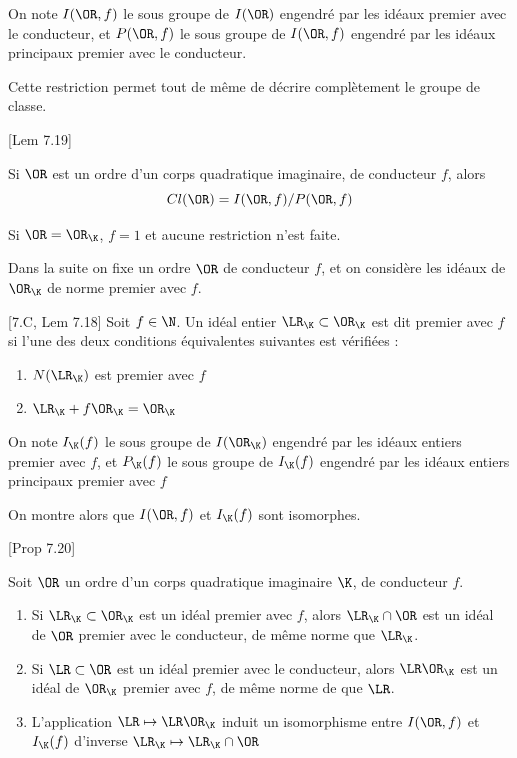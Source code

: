 \begin{Def}
	On note $I(\OR,f)$ le sous groupe de $I(\OR)$ engendré par les idéaux premier avec le conducteur, et $P(\OR,f)$ le sous groupe de $I(\OR,f)$ engendré par les idéaux principaux premier avec le conducteur.
\end{Def}

Cette restriction permet tout de même de décrire complètement le groupe de classe. 

\begin{Prop}\cite{Cox}[Lem 7.19]
	
	Si $\OR$ est un ordre d'un corps quadratique imaginaire, de conducteur $f$, alors
	\begin{equation*}
		Cl(\OR) =  I(\OR, f)/P(\OR, f)
	\end{equation*} 
\end{Prop}

\begin{Rem}
	Si $\OR = \OR_{\K}$, $f = 1$ et aucune restriction n'est faite. 
\end{Rem}

Dans la suite on fixe un ordre $\OR$ de conducteur $f$, et on considère les idéaux de $\OR_{\K}$ de norme premier avec $f$.

\begin{Def}\cite{Cox}[7.C, Lem 7.18]
	Soit $f\in\N$. Un idéal entier $\LR_{\K}\subset\OR_{\K}$ est dit premier avec $f$ si l'une des deux conditions équivalentes suivantes est vérifiées :
	
	\begin{enumerate}
		\item $N(\LR_{\K})$ est premier avec $f$
		\item $\LR_{\K} + f\OR_{\K} = \OR_{\K}$
	\end{enumerate}
	
	On note $I_{\K}(f)$ le sous groupe de $I(\OR_{\K})$ engendré par les idéaux entiers premier avec $f$, et $P_{\K}(f)$ le sous groupe de $I_{\K}(f)$ engendré par les idéaux entiers principaux premier avec $f$
\end{Def}

On montre alors que $I(\OR, f)$ et $I_{\K}(f)$ sont isomorphes.

\begin{The}\cite{Cox}[Prop 7.20]
	
	Soit $\OR$ un ordre d'un corps quadratique imaginaire $\K$, de conducteur $f$.
	\begin{enumerate}
		\item Si $\LR_{\K}\subset\OR_{\K}$ est un idéal premier avec $f$, alors $\LR_{\K}\cap\OR$ est un idéal de $\OR$ premier avec le conducteur, de même norme que $\LR_{\K}$.
		\item Si $\LR\subset\OR$ est un idéal premier avec le conducteur, alors $\LR\OR_{\K}$ est un idéal de $\OR_{\K}$ premier avec $f$, de même norme de que $\LR$.
		\item L'application $\LR\mapsto\LR\OR_{\K}$ induit un isomorphisme entre $I(\OR,f)$ et $I_{\K}(f)$ d'inverse $\LR_{\K}\mapsto\LR_{\K}\cap\OR$
	\end{enumerate}
\end{The}

